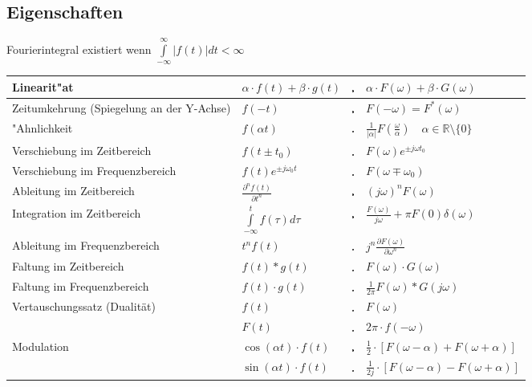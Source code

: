 	\subsection{Eigenschaften}
		Fourierintegral existiert wenn  $\int\limits_{-\infty}^{\infty}|f(t)| dt <
	\infty$\\
		\renewcommand{\arraystretch}{2}
		\begin{tabular}{|p{8cm}|l c l|}
        	\hline
        	Linearit"at & 
        	$\alpha\cdot f(t) + \beta\cdot g(t)$ & $\FT$ & $\alpha\cdot F(\omega) +
        	\beta\cdot G(\omega)$\\
        	\hline
			Zeitumkehrung (Spiegelung an der Y-Achse)&
			$f(-t)$ & $\FT$ & $F(-\omega) = F^*(\omega)$ \\
			\hline        	
  			"Ahnlichkeit &
  			$f(\alpha t)$ & $\FT$ & $\frac{1}{|\alpha|}F \left (\frac{\omega}{\alpha} \right)
  			\quad\alpha \in\mathbb{R}\setminus \{0\}$\\
  			\hline
  			Verschiebung im	Zeitbereich &
  			$f(t\pm t_0)$ & $\FT$ & $F(\omega)e^{\pm j\omega t_0}$\\
  			\hline
			Verschiebung im Frequenzbereich &
			$f(t)e^{\pm j\omega_0 t}$ & $\FT$ & $F(\omega\mp\omega_0)$\\
			\hline
			Ableitung im Zeitbereich &
			$\frac{\partial^n f(t)}{\partial t^n}$ & $\FT$ & $(j\omega)^n F(\omega)$\\
			\hline
			Integration im Zeitbereich &
			$\int\limits_{-\infty}^{t}f(\tau)d\tau $ & $\FT$ & 
			$\frac{F(\omega)}{j\omega}+\pi F(0)\delta(\omega)$\\
			\hline				
			Ableitung im Frequenzbereich &
			$t^n f(t)$ & $\FT$ & $j^n \frac{\partial F(\omega)}{\partial \omega^n}$\\
			\hline		
			Faltung im Zeitbereich &
			$f(t) \ast g(t)$ & $\FT$ & $F(\omega) \cdot G(\omega)$\\
			\hline
			Faltung im Frequenzbereich &
			$f(t) \cdot g(t)$ & $\FT$ & $\frac{1}{2\pi}F(\omega) \ast G(j\omega)$\\
			\hline
			Vertauschungssatz (Dualität) &
			$f(t)$ & $\FT$ & $F(\omega)\nonumber$ \\
 			& $F(t)$ & $\FT$ & $2\pi \cdot f(-\omega)$\\
 			\hline
 			Modulation &
 			$\cos(\alpha t) \cdot f(t)$ & $\FT$ & $\frac{1}{2}\cdot
 			\left[F(\omega-\alpha) + F(\omega+\alpha)\right ]$\\
 			& $\sin(\alpha t) \cdot f(t)$ & $\FT$ & $\frac{1}{2j}\cdot \left[
 			F(\omega-\alpha) - F(\omega+\alpha)\right ]$\\

\end{tabular}
